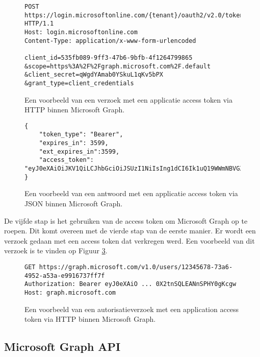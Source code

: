 \begin{figure}[!h]
    \footnotesize\begin{verbatim}
POST https://login.microsoftonline.com/{tenant}/oauth2/v2.0/token HTTP/1.1
Host: login.microsoftonline.com
Content-Type: application/x-www-form-urlencoded

client_id=535fb089-9ff3-47b6-9bfb-4f1264799865
&scope=https%3A%2F%2Fgraph.microsoft.com%2F.default
&client_secret=qWgdYAmab0YSkuL1qKv5bPX
&grant_type=client_credentials 
    \end{verbatim}    
    \caption[Voorbeeld Application Token Request Microsoft Graph]{Een voorbeeld van een verzoek met een applicatie access token via \ac{HTTP} binnen Microsoft Graph.}
    \label{MSGATRR}
\end{figure}

\begin{figure}[!h]
    \footnotesize\begin{verbatim}
{
    "token_type": "Bearer",
    "expires_in": 3599,
    "ext_expires_in":3599,
    "access_token": "eyJ0eXAiOiJKV1QiLCJhbGciOiJSUzI1NiIsIng1dCI6Ik1uQ19WWmNBVGZNNXBP..."
} 
    \end{verbatim}    
    \caption[Voorbeeld Application Token Response Microsoft Graph]{Een voorbeeld van een antwoord met een applicatie access token via \ac{JSON} binnen Microsoft Graph.}
    \label{MSGATRRES}
\end{figure}

De vijfde stap is het gebruiken van de access token om Microsoft Graph op te roepen. Dit komt overeen met de vierde stap van de eerste manier. Er wordt een verzoek gedaan met een access token dat verkregen werd. Een voorbeeld van dit verzoek is te vinden op Figuur \ref{MSGAAT}.

\begin{figure}[!h]
    \footnotesize\begin{verbatim}
GET https://graph.microsoft.com/v1.0/users/12345678-73a6-4952-a53a-e9916737ff7f
Authorization: Bearer eyJ0eXAiO ... 0X2tnSQLEANnSPHY0gKcgw
Host: graph.microsoft.com
    \end{verbatim}    
    \caption[Voorbeeld Application autorisatieverzoek Microsoft Graph]{Een voorbeeld van een autorisatieverzoek met een application access token via \ac{HTTP} binnen Microsoft Graph.}
    \label{MSGAAT}
\end{figure}



\subsection{Microsoft Graph API}

